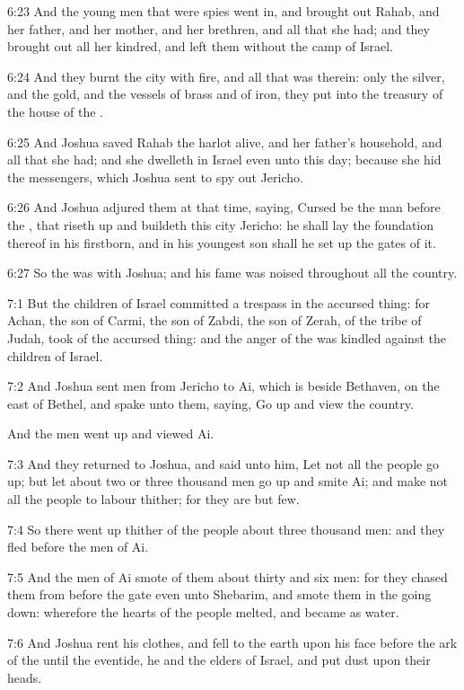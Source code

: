 6:23 And the young men that were spies went in, and brought out Rahab, and her father, and her mother, and her brethren, and all that she had; and they brought out all her kindred, and left them without the camp of Israel.

6:24 And they burnt the city with fire, and all that was therein: only the silver, and the gold, and the vessels of brass and of iron, they put into the treasury of the house of the \LORD.

6:25 And Joshua saved Rahab the harlot alive, and her father's household, and all that she had; and she dwelleth in Israel even unto this day; because she hid the messengers, which Joshua sent to spy out Jericho.

6:26 And Joshua adjured them at that time, saying, Cursed be the man before the \LORD, that riseth up and buildeth this city Jericho: he shall lay the foundation thereof in his firstborn, and in his youngest son shall he set up the gates of it.

6:27 So the \LORD was with Joshua; and his fame was noised throughout all the country.

7:1 But the children of Israel committed a trespass in the accursed thing: for Achan, the son of Carmi, the son of Zabdi, the son of Zerah, of the tribe of Judah, took of the accursed thing: and the anger of the \LORD was kindled against the children of Israel.

7:2 And Joshua sent men from Jericho to Ai, which is beside Bethaven, on the east of Bethel, and spake unto them, saying, Go up and view the country.

And the men went up and viewed Ai.

7:3 And they returned to Joshua, and said unto him, Let not all the people go up; but let about two or three thousand men go up and smite Ai; and make not all the people to labour thither; for they are but few.

7:4 So there went up thither of the people about three thousand men: and they fled before the men of Ai.

7:5 And the men of Ai smote of them about thirty and six men: for they chased them from before the gate even unto Shebarim, and smote them in the going down: wherefore the hearts of the people melted, and became as water.

7:6 And Joshua rent his clothes, and fell to the earth upon his face before the ark of the \LORD until the eventide, he and the elders of Israel, and put dust upon their heads.

